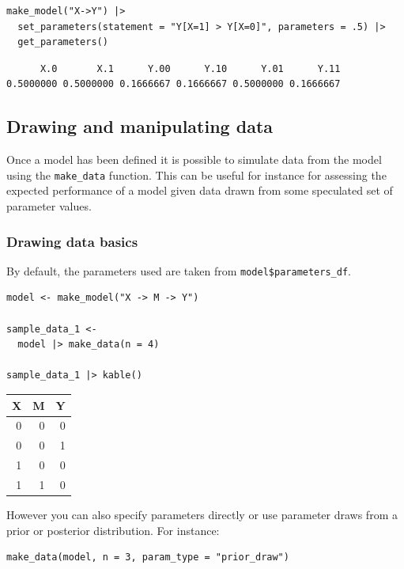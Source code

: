 \documentclass[
  article]{jss}
\begin{document}
\begin{verbatim}
make_model("X->Y") |>
  set_parameters(statement = "Y[X=1] > Y[X=0]", parameters = .5) |>
  get_parameters()
\end{verbatim}

\begin{verbatim}
      X.0       X.1      Y.00      Y.10      Y.01      Y.11 
0.5000000 0.5000000 0.1666667 0.1666667 0.5000000 0.1666667 
\end{verbatim}

\hypertarget{drawing-and-manipulating-data}{%
\subsection{Drawing and manipulating
data}\label{drawing-and-manipulating-data}}

Once a model has been defined it is possible to simulate data from the
model using the \texttt{make\_data} function. This can be useful for
instance for assessing the expected performance of a model given data
drawn from some speculated set of parameter values.

\hypertarget{drawing-data-basics}{%
\subsubsection{Drawing data basics}\label{drawing-data-basics}}

By default, the parameters used are taken from
\texttt{model\$parameters\_df}.

\begin{verbatim}
model <- make_model("X -> M -> Y")

sample_data_1 <- 
  model |> make_data(n = 4) 

sample_data_1 |> kable()
\end{verbatim}

\begin{longtable}[]{@{}rrr@{}}
\toprule()
X & M & Y \\
\midrule()
\endhead
0 & 0 & 0 \\
0 & 0 & 1 \\
1 & 0 & 0 \\
1 & 1 & 0 \\
\bottomrule()
\end{longtable}

However you can also specify parameters directly or use parameter draws
from a prior or posterior distribution. For instance:

\begin{verbatim}
make_data(model, n = 3, param_type = "prior_draw")
\end{verbatim}
\end{document}
